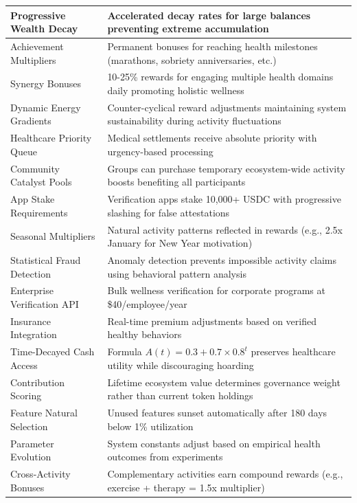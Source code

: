 \documentclass[11pt,letterpaper]{article}
\begin{document}
\begin{longtable}{p{5cm}p{9.5cm}}
\midrule
Progressive Wealth Decay & Accelerated decay rates for large balances preventing extreme accumulation \\
\midrule
Achievement Multipliers & Permanent bonuses for reaching health milestones (marathons, sobriety anniversaries, etc.) \\
\midrule
Synergy Bonuses & 10-25\% rewards for engaging multiple health domains daily promoting holistic wellness \\
\midrule
Dynamic Energy Gradients & Counter-cyclical reward adjustments maintaining system sustainability during activity fluctuations \\
\midrule
Healthcare Priority Queue & Medical settlements receive absolute priority with urgency-based processing \\
\midrule
Community Catalyst Pools & Groups can purchase temporary ecosystem-wide activity boosts benefiting all participants \\
\midrule
App Stake Requirements & Verification apps stake 10,000+ USDC with progressive slashing for false attestations \\
\midrule
Seasonal Multipliers & Natural activity patterns reflected in rewards (e.g., 2.5x January for New Year motivation) \\
\midrule
Statistical Fraud Detection & Anomaly detection prevents impossible activity claims using behavioral pattern analysis \\
\midrule
Enterprise Verification API & Bulk wellness verification for corporate programs at \$40/employee/year \\
\midrule
Insurance Integration & Real-time premium adjustments based on verified healthy behaviors \\
\midrule
Time-Decayed Cash Access & Formula $A(t) = 0.3 + 0.7 \times 0.8^t$ preserves healthcare utility while discouraging hoarding \\
\midrule
Contribution Scoring & Lifetime ecosystem value determines governance weight rather than current token holdings \\
\midrule
Feature Natural Selection & Unused features sunset automatically after 180 days below 1\% utilization \\
\midrule
Parameter Evolution & System constants adjust based on empirical health outcomes from experiments \\
\midrule
Cross-Activity Bonuses & Complementary activities earn compound rewards (e.g., exercise + therapy = 1.5x multiplier) \\
\midrule

\end{longtable}
\end{document}
